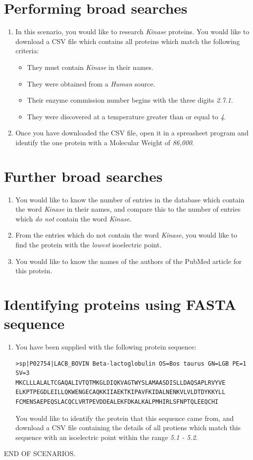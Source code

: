 \documentclass[12pt,twoside]{report}
\begin{document}
\section{Performing broad searches}
\begin{enumerate}
\item In this scenario, you would like to research \textit{Kinase}
  proteins. You would like to download a CSV file which contains all
  proteins which match the following criteria:
  \begin{itemize}
  \item They must contain \textit{Kinase} in their names.
  \item They were obtained from a \textit{Human} source.
  \item Their enzyme commission number begins with the three digits
    \textit{2.7.1}.
  \item They were discovered at a temperature greater than or equal to \textit{4\celsius}.
  \end{itemize}
\item Once you have downloaded the CSV file, open it in a spreasheet
  program and identify the one protein with a Molecular Weight of
  \textit{86,000}.
\end{enumerate}

\section{Further broad searches}
\begin{enumerate}
\item You would like to know the number of entries in the database
  which contain the word \textit{Kinase} in their names, and compare
  this to the number of entries which \textit{do not} contain the word
  \textit{Kinase}.
\item From the entries which do not contain the word \textit{Kinase},
  you would like to find the protein with the \textit{lowest}
  isoelectric point.
\item You would like to know the names of the authors of the PubMed
  article for this protein.
\end{enumerate}

\newpage
\section{Identifying proteins using FASTA sequence}
\begin{enumerate}
\item You have been supplied with the following protein sequence:
\begin{verbatim}
>sp|P02754|LACB_BOVIN Beta-lactoglobulin OS=Bos taurus GN=LGB PE=1 SV=3
MKCLLLALALTCGAQALIVTQTMKGLDIQKVAGTWYSLAMAASDISLLDAQSAPLRVYVE
ELKPTPEGDLEILLQKWENGECAQKKIIAEKTKIPAVFKIDALNENKVLVLDTDYKKYLL
FCMENSAEPEQSLACQCLVRTPEVDDEALEKFDKALKALPMHIRLSFNPTQLEEQCHI
\end{verbatim}

You would like to identify the protein that this sequence came from,
and download a CSV file containing the details of all protiens which
match this sequence with an isoelectric point within the range
\textit{5.1 - 5.2}.
\end{enumerate}

{\centering END OF SCENARIOS.\par}
\end{document}
